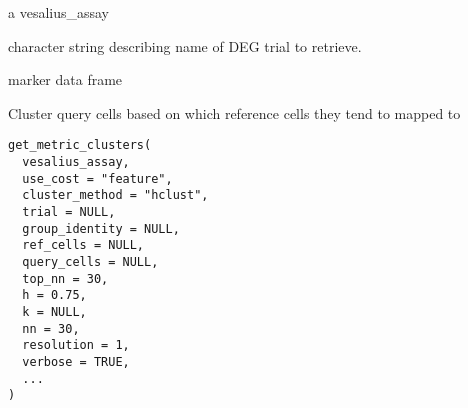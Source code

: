 \documentclass[a4paper]{book}
\begin{document}
%
\begin{Arguments}
\begin{ldescription}
\item[\code{vesalius\_assay}] a vesalius\_assay

\item[\code{trial}] character string describing name of DEG trial 
to retrieve.
\end{ldescription}
\end{Arguments}
%
\begin{Value}
marker data frame
\end{Value}
%
\begin{Description}
Cluster query cells based on which reference cells they tend to mapped to
\end{Description}
%
\begin{Usage}
\begin{verbatim}
get_metric_clusters(
  vesalius_assay,
  use_cost = "feature",
  cluster_method = "hclust",
  trial = NULL,
  group_identity = NULL,
  ref_cells = NULL,
  query_cells = NULL,
  top_nn = 30,
  h = 0.75,
  k = NULL,
  nn = 30,
  resolution = 1,
  verbose = TRUE,
  ...
)
\end{verbatim}
\end{Usage}
%
\end{document}
